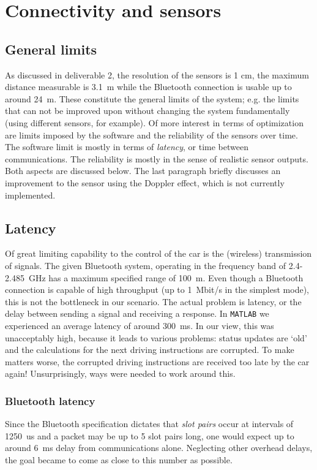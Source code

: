 \documentclass[11pt,titlepage]{report}
\begin{document}
\chapter{Connectivity and sensors}
\label{ch:anticollision}
\section{General limits}
As discussed in deliverable 2, the resolution of the sensors is 1 cm, the maximum distance measurable is \SI{3.1}{m} while the Bluetooth connection is usable up to around \SI{24}{m}. These constitute the general limits of the system; e.g. the limits that can not be improved upon without changing the system fundamentally (using different sensors, for example). Of more interest in terms of optimization are limits imposed by the software and the reliability of the sensors over time. The software limit is mostly in terms of \textit{latency}, or time between communications. The reliability is mostly in the sense of realistic sensor outputs. Both aspects are discussed below. The last paragraph briefly discusses an improvement to the sensor using the Doppler effect, which is not currently implemented.

\section{Latency}
Of great limiting capability to the control of the car is the (wireless) transmission of signals. The given Bluetooth system, operating in the frequency band of \num{2.4}-\SI{2.485}{GHz} has a maximum specified range of \SI{100}{m}.  Even though a Bluetooth connection is capable of high throughput (up to \SI{1}{Mbit/s} in the simplest mode), this is not the bottleneck in our scenario. The actual problem is latency, or the delay between sending a signal and receiving a response. In \texttt{MATLAB} we experienced an average latency of around \SI{300}{ms}. In our view, this was unacceptably high, because it leads to various problems: status updates are `old' and the calculations for the next driving instructions are corrupted. To make matters worse, the corrupted driving instructions are received too late by the car again! Unsurprisingly, ways were needed to work around this.
\subsection{Bluetooth latency}
Since the Bluetooth specification dictates that \textit{slot pairs} occur at intervals of \SI{1250}{us} and a packet may be up to 5 slot pairs long, one would expect up to around \SI{6}{ms} delay from communications alone. Neglecting other overhead delays, the goal became to come as close to this number as possible. 
\end{document}
